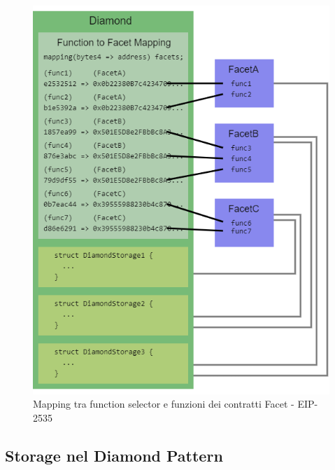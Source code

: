\documentclass[12pt,a4paper]{report}
\begin{document}
\begin{figure}[H]
  \includegraphics[scale=0.35]{facet.png}
  \centering
  \caption{Mapping tra function selector e funzioni dei contratti Facet - EIP-2535\cite{diamond}}
  \label{fig:facet}
\end{figure}


\subsection{Storage nel Diamond Pattern}
\end{document}
